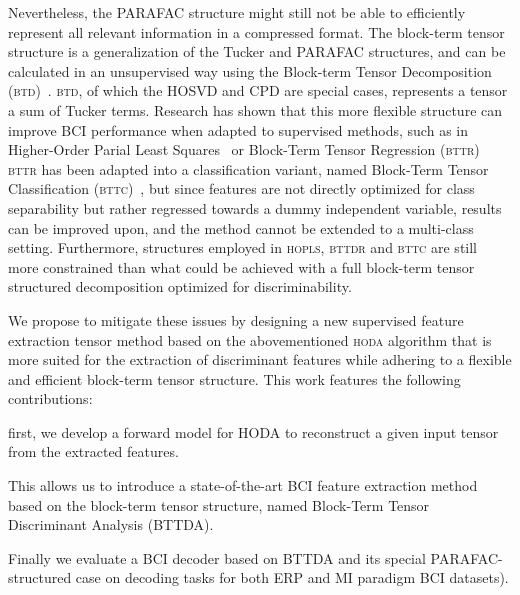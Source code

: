 \documentclass[twocolumn]{article}
\begin{document}
Nevertheless, the \textsc{PARAFAC} structure might still not be able to
efficiently represent all relevant information in a compressed format.
The block-term tensor structure is a generalization of the Tucker and
\textsc{PARAFAC} structures, and can be calculated in an unsupervised way using
the Block-term Tensor Decomposition
(\textsc{btd})~\cite{DeLathauwer2008,DeLathauwer2008a,DeLathauwer2008b,Rontogiannis2021}.
\textsc{btd}, of which the \textsc{HOSVD} and \textsc{CPD} are special cases,
represents a tensor a sum of Tucker terms.
Research has shown that this more flexible structure can improve BCI performance
when adapted to supervised methods, such as in Higher-Order Parial Least
Squares~\cite{Camarrone2018} or Block-Term Tensor Regression (\textsc{bttr})~\cite{Faes2022,Faes2022b}
\textsc{bttr} has been adapted into a classification variant, named Block-Term
Tensor Classification (\textsc{bttc})~\cite{Camarrone2021}, but since features
are not directly optimized for class separability but rather regressed towards
a dummy independent variable, results can be improved upon, and the method
cannot be extended to a multi-class setting.
Furthermore, structures employed in \textsc{hopls}, \textsc{bttdr} and
\textsc{bttc} are still more constrained than what could be achieved with a
full block-term tensor structured decomposition optimized for discriminability.


We propose to mitigate these issues by designing a new supervised feature
extraction tensor method based on the abovementioned \textsc{hoda} algorithm
that is more suited for the extraction of discriminant
features while adhering to a flexible and efficient block-term tensor
structure.
This work features the following contributions:
\begin{enumerate*}[label={\arabic*)}]
	\item first, we develop a forward model for \textsc{HODA} to reconstruct a
	      given input tensor from the extracted features.
	\item This allows us to introduce a state-of-the-art BCI feature extraction
        method based on the block-term tensor structure, named Block-Term Tensor Discriminant Analysis
	      (\textsc{BTTDA}).
      \item Finally we evaluate a BCI decoder based on \textsc{BTTDA} and its special
	      \textsc{PARAFAC}-structured case on decoding tasks for both ERP and MI
	      paradigm BCI datasets).
\end{enumerate*}
\end{document}
